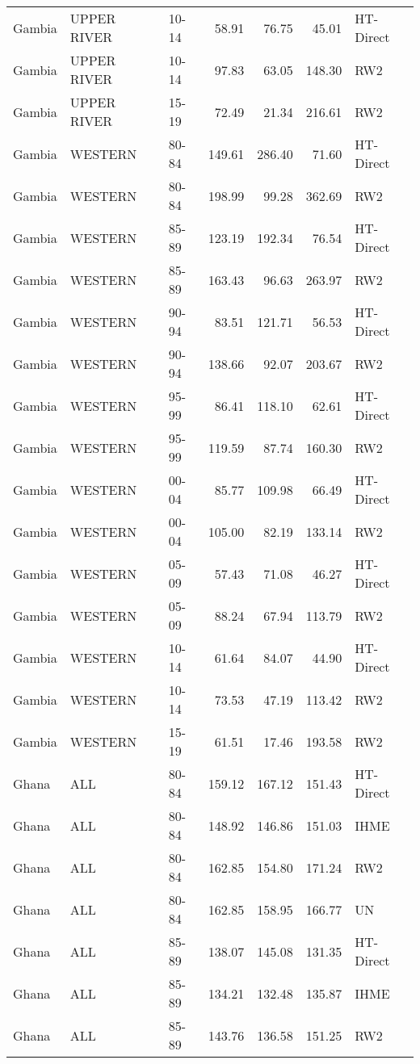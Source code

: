 \begin{longtable}{lllrrrl}
  Gambia & UPPER RIVER & 10-14 & 58.91 & 76.75 & 45.01 & HT-Direct \\ 
  Gambia & UPPER RIVER & 10-14 & 97.83 & 63.05 & 148.30 & RW2 \\ 
  Gambia & UPPER RIVER & 15-19 & 72.49 & 21.34 & 216.61 & RW2 \\ 
  Gambia & WESTERN & 80-84 & 149.61 & 286.40 & 71.60 & HT-Direct \\ 
  Gambia & WESTERN & 80-84 & 198.99 & 99.28 & 362.69 & RW2 \\ 
  Gambia & WESTERN & 85-89 & 123.19 & 192.34 & 76.54 & HT-Direct \\ 
  Gambia & WESTERN & 85-89 & 163.43 & 96.63 & 263.97 & RW2 \\ 
  Gambia & WESTERN & 90-94 & 83.51 & 121.71 & 56.53 & HT-Direct \\ 
  Gambia & WESTERN & 90-94 & 138.66 & 92.07 & 203.67 & RW2 \\ 
  Gambia & WESTERN & 95-99 & 86.41 & 118.10 & 62.61 & HT-Direct \\ 
  Gambia & WESTERN & 95-99 & 119.59 & 87.74 & 160.30 & RW2 \\ 
  Gambia & WESTERN & 00-04 & 85.77 & 109.98 & 66.49 & HT-Direct \\ 
  Gambia & WESTERN & 00-04 & 105.00 & 82.19 & 133.14 & RW2 \\ 
  Gambia & WESTERN & 05-09 & 57.43 & 71.08 & 46.27 & HT-Direct \\ 
  Gambia & WESTERN & 05-09 & 88.24 & 67.94 & 113.79 & RW2 \\ 
  Gambia & WESTERN & 10-14 & 61.64 & 84.07 & 44.90 & HT-Direct \\ 
  Gambia & WESTERN & 10-14 & 73.53 & 47.19 & 113.42 & RW2 \\ 
  Gambia & WESTERN & 15-19 & 61.51 & 17.46 & 193.58 & RW2 \\ 
  Ghana & ALL & 80-84 & 159.12 & 167.12 & 151.43 & HT-Direct \\ 
  Ghana & ALL & 80-84 & 148.92 & 146.86 & 151.03 & IHME \\ 
  Ghana & ALL & 80-84 & 162.85 & 154.80 & 171.24 & RW2 \\ 
  Ghana & ALL & 80-84 & 162.85 & 158.95 & 166.77 & UN \\ 
  Ghana & ALL & 85-89 & 138.07 & 145.08 & 131.35 & HT-Direct \\ 
  Ghana & ALL & 85-89 & 134.21 & 132.48 & 135.87 & IHME \\ 
  Ghana & ALL & 85-89 & 143.76 & 136.58 & 151.25 & RW2 \\ 

\end{longtable}
